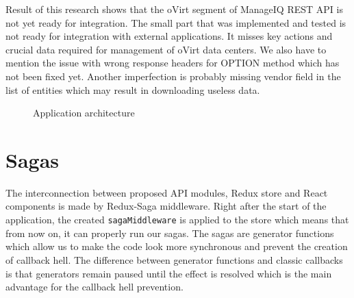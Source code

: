 Result of this research shows that the oVirt segment of ManageIQ REST API is not yet ready for integration. The small part that was implemented and tested is not ready for integration with external applications. It misses key actions and crucial data required for management of oVirt data centers. We also have to mention the issue with wrong response headers for OPTION method which has not been fixed yet. Another imperfection is probably missing vendor field in the list of entities which may result in downloading useless data.

\begin{figure}[h]
\caption{Application architecture}
\label{app_architecture}
\end{figure}

\section{Sagas}
The interconnection between proposed API modules, Redux store and React components is made by Redux-Saga middleware. Right after the start of the application, the created \texttt{sagaMiddleware} is applied to the store which means that from now on, it can properly run our sagas. The sagas are generator functions which allow us to make the code look more synchronous and prevent the creation of callback hell. The difference between generator functions and classic callbacks is that generators remain paused until the effect is resolved which is the main advantage for the callback hell prevention.

